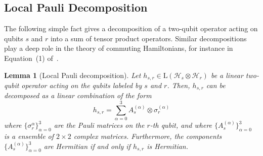 \documentclass[a4paper,onecolumn,11pt]{quantumarticle}
\theoremstyle{plain}
\newtheorem{lemma}[theorem]{Lemma}
\begin{document}
\subsection{Local Pauli Decomposition}
The following simple fact gives a decomposition of a two-qubit operator acting on qubits $s$ and $r$ into a sum of tensor product operators. Similar decompositions play a deep role in the theory of commuting Hamiltonians, for instance in Equation~(1) of~\cite{aharonov2011complexity}.

\begin{lemma}[Local Pauli decomposition]\label{algebra-fact-pauli-decomposition}
    Let $h_{s,r} \in \mathrm{L}(\mathcal{H}_s \otimes \mathcal{H}_r)$ be a linear two-qubit operator acting on the qubits labeled by $s$ and $r$. Then, $h_{s,r}$ can be decomposed as a linear combination of the form
    \begin{equation}\label{eqn:local-pauli-decomposition}
        h_{s,r} = \sum\limits_{\alpha = 0}^{3} A_s^{(\alpha)} \otimes \sigma_r^{(\alpha)}
    \end{equation}
where $\{\sigma_r^{\alpha}\}_{\alpha=0}^3$ are the Pauli matrices on the $r$-th qubit, and where $\{A_s^{(\alpha)}\}_{\alpha=0}^3$ is a ensemble of $2 \times 2$ complex matrices. Furthermore, the components $\{A_s^{(\alpha)}\}_{\alpha=0}^3$ are Hermitian if and only if $h_{s, r}$ is Hermitian.
\end{lemma}
\end{document}
